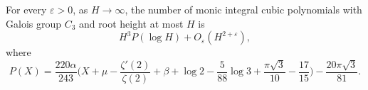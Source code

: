 \begin{theorem}

\label{thm:generalMonicCount}


\leanok



 For every $\varepsilon>0$, as $H\to\infty$, the number of monic integral cubic polynomials with Galois group $C_3$ and root height at most $H$ is \[ H^3P(\log H)+O_\varepsilon(H^{2+\varepsilon}), \] where \begin{equation*} P(X)=\frac{220\alpha}{243} \biggl(X+\mu-\frac{\zeta'(2)}{\zeta(2)}+ \beta +\log2-\frac{5}{88}\log3 +\frac{\pi\sqrt3}{10}-\frac{17}{15}\biggr) -\frac{20\pi\sqrt3}{81}. \end{equation*} 

\end{theorem}

